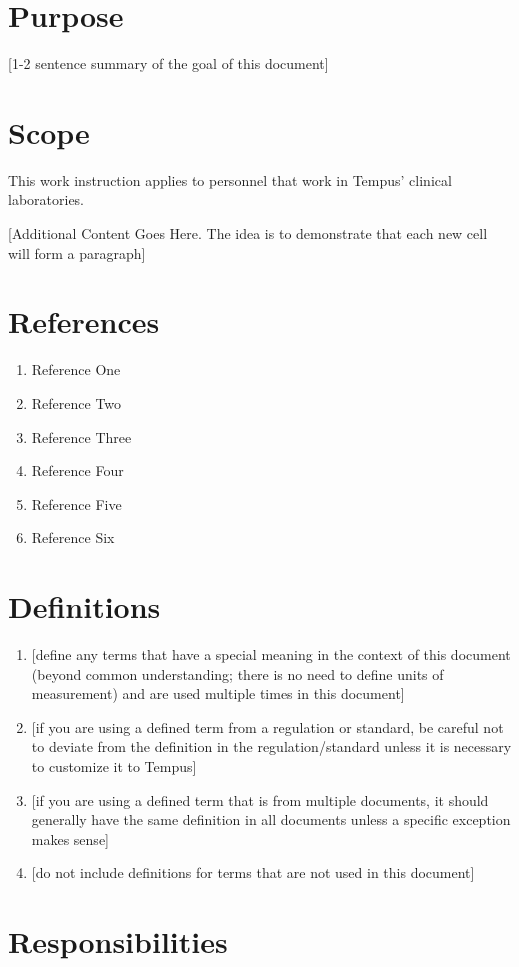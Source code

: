 \documentclass[12pt]{article}
\begin{document}
\thispagestyle{fancy}
\pagestyle{fancy}
\section{Purpose}
[1-2 sentence summary of the goal of this document]
\section{Scope}
This work instruction applies to personnel that work in Tempus' clinical laboratories.

[Additional Content Goes Here.  The idea is to demonstrate that each new cell will form a paragraph]

\section{References}
\begin{enumerate}
\item{Reference One}
\item{Reference Two}
\item{Reference Three}
\item{Reference Four}
\item{Reference Five}
\item{Reference Six}
\end{enumerate}
\section{Definitions}
\begin{enumerate}
\item{[define any terms that have a special meaning in the context of this document (beyond common understanding; there is no need to define units of measurement) and are used multiple times in this document]}
\item{[if you are using a defined term from a regulation or standard, be careful not to deviate from the definition in the regulation/standard unless it is necessary to customize it to Tempus]}
\item{[if you are using a defined term that is from multiple documents, it should generally have the same definition in all documents unless a specific exception makes sense]}
\item{[do not include definitions for terms that are not used in this document]}
\end{enumerate}
\section{Responsibilities}
\end{document}
